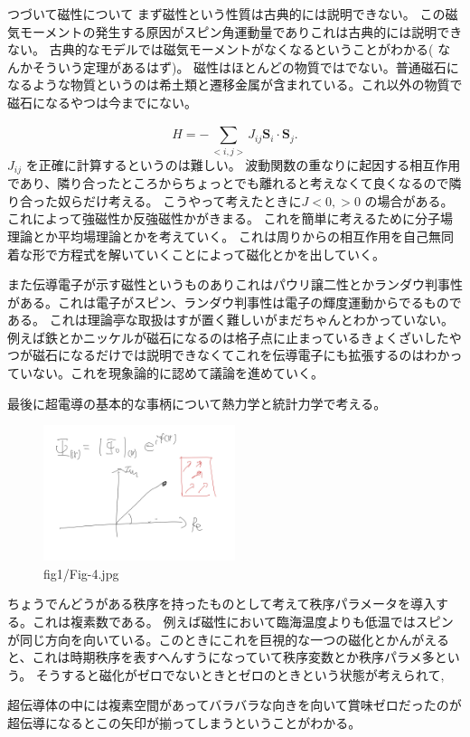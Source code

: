 \documentclass[dvipdfmx,12pt]{jsarticle}
\begin{document}
つづいて磁性について
まず磁性という性質は古典的には説明できない。
この磁気モーメントの発生する原因がスピン角運動量でありこれは古典的には説明できない。
古典的なモデルでは磁気モーメントがなくなるということがわかる( なんかそういう定理があるはず)。
磁性はほとんどの物質ではでない。普通磁石になるような物質というのは希土類と遷移金属が含まれている。これ以外の物質で磁石になるやつは今までにない。

\[
H=-\sum_{<i,j>}^{}J_{ij} \bm{S}_i\cdot \bm{S}_j
.\] 
$J_{ij}$ を正確に計算するというのは難しい。
波動関数の重なりに起因する相互作用であり、隣り合ったところからちょっとでも離れると考えなくて良くなるので隣り合った奴らだけ考える。
こうやって考えたときに$J<0,>0$ の場合がある。
これによって強磁性か反強磁性かがきまる。
これを簡単に考えるために分子場理論とか平均場理論とかを考えていく。
これは周りからの相互作用を自己無同着な形で方程式を解いていくことによって磁化とかを出していく。

また伝導電子が示す磁性というものありこれはパウリ譲二性とかランダウ判事性がある。これは電子がスピン、ランダウ判事性は電子の輝度運動からでるものである。
これは理論亭な取扱はすが置く難しいがまだちゃんとわかっていない。
例えば鉄とかニッケルが磁石になるのは格子点に止まっているきょくざいしたやつが磁石になるだけでは説明できなくてこれを伝導電子にも拡張するのはわかっていない。これを現象論的に認めて議論を進めていく。


最後に超電導の基本的な事柄について熱力学と統計力学で考える。
\begin{figure}[H]
	\centering
	\includegraphics[width=0.5\textwidth]{fig1/Fig-4.jpg}
	\caption{fig1/Fig-4.jpg}
	\label{fig:fig1-Fig-4-jpg}
\end{figure}
ちょうでんどうがある秩序を持ったものとして考えて秩序パラメータを導入する。これは複素数である。
例えば磁性において臨海温度よりも低温ではスピンが同じ方向を向いている。このときにこれを巨視的な一つの磁化とかんがえると、これは時期秩序を表すへんすうになっていて秩序変数とか秩序パラメ多という。
そうすると磁化がゼロでないときとゼロのときという状態が考えられて,

超伝導体の中には複素空間があってバラバラな向きを向いて賞味ゼロだったのが超伝導になるとこの矢印が揃ってしまうということがわかる。
\end{document}
